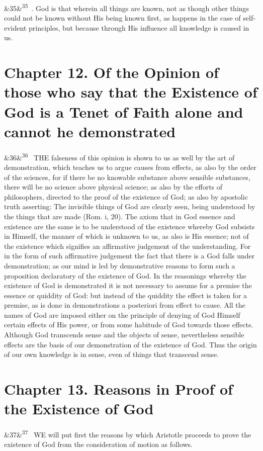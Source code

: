 \documentclass[12pt]{article}
\newcommand{\para}[1][]{\par\noindent\ifx&#1&\else\textsuperscript{\footnotesize #1}~\fi}
\begin{document}
\para[35] 5. God is that wherein all things are known, not as though other things could not be known without His being known first, as happens in the case of self-evident principles, but because through His influence all knowledge is caused in us.

\section*{Chapter 12. Of the Opinion of those who say that the Existence of God is a Tenet of Faith alone and cannot he demonstrated}

\para[36] THE falseness of this opinion is shown to us as well by the art of demonstration, which teaches us to argue causes from effects, as also by the order of the sciences, for if there be no knowable substance above sensible substances, there will be no science above physical science; as also by the efforts of philosophers, directed to the proof of the existence of God; as also by apostolic truth asserting: The invisible things of God are clearly seen, being understood by the things that are made (Rom. i, 20). The axiom that in God essence and existence are the same is to be understood of the existence whereby God subsists in Himself, the manner of which is unknown to us, as also is His essence; not of the existence which signifies an affirmative judgement of the understanding. For in the form of such affirmative judgement the fact that there is a God falls under demonstration; as our mind is led by demonstrative reasons to form such a proposition declaratory of the existence of God. In the reasonings whereby the existence of God is demonstrated it is not necessary to assume for a premise the essence or quiddity of God: but instead of the quiddity the effect is taken for a premise, as is done in demonstrations a posteriori from effect to cause. All the names of God are imposed either on the principle of denying of God Himself certain effects of His power, or from some habitude of God towards those effects. Although God transcends sense and the objects of sense, nevertheless sensible effects are the basis of our demonstration of the existence of God. Thus the origin of our own knowledge is in sense, even of things that transcend sense.

\section*{Chapter 13. Reasons in Proof of the Existence of God}

\para[37] WE will put first the reasons by which Aristotle proceeds to prove the existence of God from the consideration of motion as follows.
\end{document}
